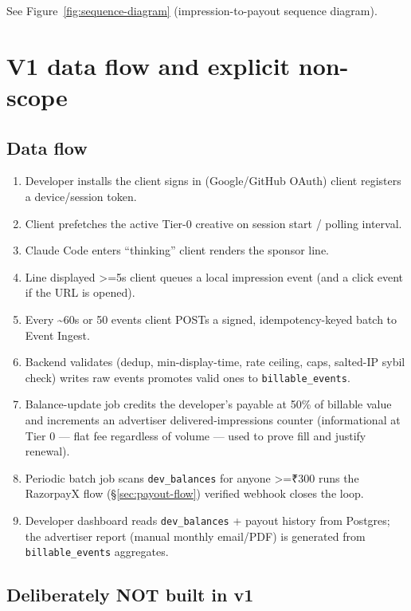 See Figure~\ref{fig:sequence-diagram} (impression-to-payout sequence diagram).

\section{V1 data flow and explicit non-scope}
\label{sec:v1-data-flow}

\subsection{Data flow}
\label{sec:data-flow}

\begin{enumerate}
  \item Developer installs the client \textrightarrow{} signs in (Google/GitHub OAuth) \textrightarrow{} client registers a device/session token.
  \item Client prefetches the active Tier-0 creative on session start / polling interval.
  \item Claude Code enters ``thinking'' \textrightarrow{} client renders the sponsor line.
  \item Line displayed \textgreater{}=5s \textrightarrow{} client queues a local impression event (and a click event if the URL is opened).
  \item Every \textasciitilde{}60s or 50 events \textrightarrow{} client POSTs a signed, idempotency-keyed batch to Event Ingest.
  \item Backend validates (dedup, min-display-time, rate ceiling, caps, salted-IP sybil check) \textrightarrow{} writes raw events \textrightarrow{} promotes valid ones to \texttt{billable\_events}.
  \item Balance-update job credits the developer's payable at 50\% of billable value and increments an advertiser delivered-impressions counter (informational at Tier 0 --- flat fee regardless of volume --- used to prove fill and justify renewal).
  \item Periodic batch job scans \texttt{dev\_balances} for anyone \textgreater{}=₹300 \textrightarrow{} runs the RazorpayX flow (\S\ref{sec:payout-flow}) \textrightarrow{} verified webhook closes the loop.
  \item Developer dashboard reads \texttt{dev\_balances} + payout history from Postgres; the advertiser report (manual monthly email/PDF) is generated from \texttt{billable\_events} aggregates.
\end{enumerate}

\subsection{Deliberately NOT built in v1}
\label{sec:not-built-v1}


